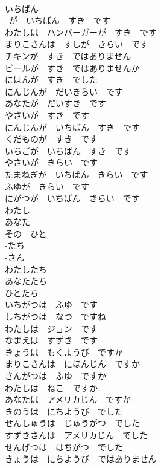\documentclass[8pt]{extreport}
\begin{document}
\begin{CJK}{UTF8}{min}
\\	いちばん	
\\	~が　いちばん　すき　です	
\\	わたしは　ハンバーガーが　すき　です	
\\	まりこさんは　すしが　きらい　です	
\\	チキンが　すき　ではありません	
\\	ビールが　すき　ではありませんか	
\\	にほんが　すき　でした	
\\	にんじんが　だいきらい　です	
\\	あなたが　だいすき　です	
\\	やさいが　すき　です	
\\	にんじんが　いちばん　すき　です	
\\	くだものが　すき　です	
\\	いちごが　いちばん　すき　です	
\\	やさいが　きらい　です	
\\	たまねぎが　いちばん　きらい　です	
\\	ふゆが　きらい　です	
\\	にがつが　いちばん　きらい　です	
\\	わたし	
\\	あなた	
\\	その　ひと	
\\	-たち	
\\	-さん	
\\	わたしたち	
\\	あなたたち	
\\	ひとたち	
\\	いちがつは　ふゆ　です	
\\	しちがつは　なつ　ですね	
\\	わたしは　ジョン　です	
\\	なまえは　すずき　です	
\\	きょうは　もくようび　ですか	
\\	まりこさんは　にほんじん　ですか	
\\	さんがつは　ふゆ　ですか	
\\	わたしは　ねこ　ですか	
\\	あなたは　アメリカじん　ですか	
\\	きのうは　にちようび　でした	
\\	せんしゅうは　じゅうがつ　でした	
\\	すずきさんは　アメリカじん　でした	
\\	せんげつは　はちがつ　でした	
\\	きょうは　にちようび　ではありません	

\end{CJK}
\end{document}
